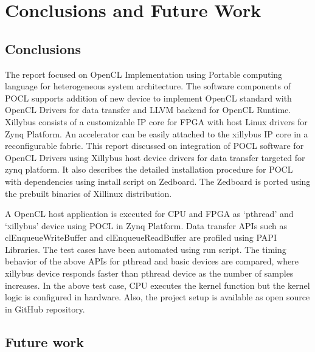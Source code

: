 \chapter{Conclusions and Future Work}
\label{ch6_Conclusions_and_Future_Work}

\section{Conclusions}
The report focused on OpenCL Implementation using Portable computing language for heterogeneous system architecture. The software components of POCL supports addition of new device to implement OpenCL standard with OpenCL Drivers for data transfer and LLVM backend for OpenCL Runtime. Xillybus consists of a customizable IP core for FPGA with host Linux drivers for Zynq Platform. An accelerator can be easily attached to the xillybus IP core in a reconfigurable fabric. This report discussed on integration of POCL software for OpenCL Drivers using Xillybus host device drivers for data transfer targeted for zynq platform. It also describes the detailed installation procedure for POCL with dependencies using install script on Zedboard. The Zedboard is ported using the prebuilt binaries of Xillinux distribution.

A OpenCL host application is executed for CPU and FPGA as ‘pthread’ and ‘xillybus’ device using POCL in Zynq Platform. Data transfer APIs such as clEnqueueWriteBuffer and clEnqueueReadBuffer are profiled using PAPI Libraries. The test cases have been automated using run script. The timing behavior of the above APIs for pthread and basic devices are compared, where xillybus device responds faster than pthread device as the number of samples increases. In the above test case, CPU executes the kernel function but the kernel logic is configured in hardware. Also, the project setup is available as open source in GitHub repository. 
 

\section{Future work}